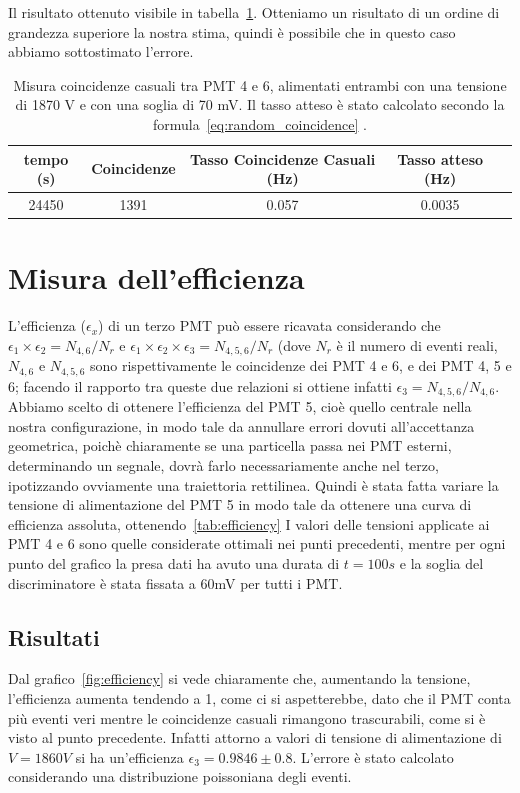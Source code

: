 \documentclass[a4paper,10pt]{article}
\begin{document}
Il risultato ottenuto visibile in tabella~\ref{tab:random_coincidence_mesured}. Otteniamo un risultato di un ordine di grandezza superiore la nostra stima, quindi è possibile che in questo caso abbiamo sottostimato l'errore. 

\begin{table}
\centering
\begin{tabular}{|c|c|c|c|c|}
\hline 
tempo (s) & Coincidenze & Tasso Coincidenze Casuali (Hz) & Tasso atteso (Hz) \\ 
\hline 
24450 & 1391 & 0.057 & 0.0035\\ 
\hline 
\end{tabular} 
\caption{Misura coincidenze casuali tra PMT 4 e 6, alimentati entrambi con una tensione di 1870 V e con una soglia di 70 mV. Il tasso atteso è stato calcolato secondo la formula~\ref{eq:random_coincidence} .}
\label{tab:random_coincidence_mesured}
\end{table}

\section{Misura dell'efficienza}
L'efficienza ($\epsilon_x$) di un terzo PMT può essere ricavata considerando che $\epsilon_1\times \epsilon_2=N_{4,6}/N_r$ e $\epsilon_1\times\epsilon_2\times \epsilon_3=N_{4,5,6}/N_r$ (dove $N_r$ è il numero di eventi reali, $N_{4,6}$ e $N_{4,5,6}$ sono rispettivamente le coincidenze dei PMT 4 e 6, e dei PMT 4, 5 e 6; facendo il rapporto tra queste due relazioni si ottiene infatti $\epsilon_3=N_{4,5,6}/N_{4,6}$. Abbiamo scelto di ottenere l'efficienza del PMT 5, cioè quello centrale nella nostra configurazione, in modo tale da annullare errori dovuti all'accettanza geometrica, poichè chiaramente se una particella passa nei PMT esterni, determinando un segnale, dovrà farlo necessariamente anche nel terzo, ipotizzando ovviamente una traiettoria rettilinea. Quindi è stata fatta variare la tensione di alimentazione del PMT 5 in modo tale da ottenere una curva di efficienza assoluta, ottenendo~\ref{tab:efficiency}
I valori delle tensioni applicate ai PMT 4 e 6 sono quelle considerate ottimali nei punti precedenti, mentre per ogni punto del grafico la presa dati ha avuto una durata di $t=100s$ e la soglia del discriminatore è stata fissata a 60mV per tutti i PMT.
\subsection{Risultati}
Dal grafico~\ref{fig:efficiency} si vede chiaramente che, aumentando la tensione, l'efficienza aumenta tendendo a 1, come ci si aspetterebbe, dato che il PMT conta più eventi veri mentre le coincidenze casuali rimangono trascurabili, come si è visto al punto precedente. Infatti attorno a valori di tensione di alimentazione di $V=1860V$ si ha un'efficienza $\epsilon_3=0.9846\pm0.8$. L'errore è stato calcolato considerando una distribuzione poissoniana degli eventi.
\end{document}
